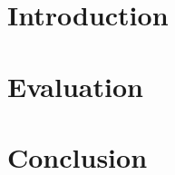 


\maketitle
\thispagestyle{empty}

\begin{abstract}
    
\end{abstract}

\section{Introduction}
    



\section{Evaluation}
    

\section{Conclusion}
    


{\small


}

 